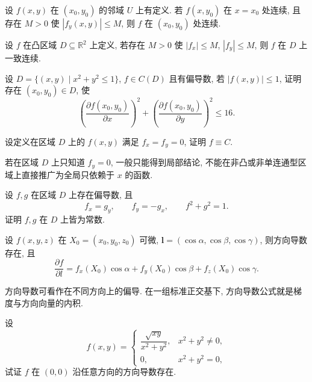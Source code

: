 \documentclass[../数学分析培优讲义.tex]{subfiles}
\begin{document}
\begin{example}
设 $f(x,y)$ 在 $(x_0,y_0)$ 的邻域 $U$ 上有定义. 若 $f(x,y_0)$ 在 $x=x_0$ 处连续, 且存在 $M>0$ 使 $|f_y(x,y)|\leq M$, 则 $f$ 在 $(x_0,y_0)$ 处连续.
\end{example}
\exampleblank

\begin{example}
设 $f$ 在凸区域 $D\subseteq\mathbb{R}^2$ 上定义, 若存在 $M>0$ 使 $|f_x|\leq M$, $|f_y|\leq M$, 则 $f$ 在 $D$ 上一致连续.
\end{example}
\exampleblank

\begin{example}
设 $D=\{(x,y)\mid x^2+y^2\leq1\}$, $f\in C(D)$ 且有偏导数, 若 $|f(x,y)|\leq1$, 证明存在 $(x_0,y_0)\in D$, 使
\[
    \left(\dfrac{\partial f(x_0,y_0)}{\partial x}\right)^2
    +\left(\dfrac{\partial f(x_0,y_0)}{\partial y}\right)^2\leq16.
\]
\end{example}
\exampleblank

\begin{example}
设定义在区域 $D$ 上的 $f(x,y)$ 满足 $f_x=f_y=0$, 证明 $f\equiv C$.
\end{example}
\exampleblank

\begin{remark}
若在区域 $D$ 上只知道 $f_y=0$, 一般只能得到局部结论, 不能在非凸或非单连通型区域上直接推广为全局只依赖于 $x$ 的函数.
\end{remark}

\begin{example}
设 $f,g$ 在区域 $D$ 上存在偏导数, 且
\[
    f_x=g_y,\qquad f_y=-g_x,\qquad f^2+g^2=1.
\]
证明 $f,g$ 在 $D$ 上皆为常数.
\end{example}
\exampleblank

\begin{theorem}[\markstar]
设 $f(x,y,z)$ 在 $X_0=(x_0,y_0,z_0)$ 可微, $\bm l=(\cos\alpha,\cos\beta,\cos\gamma)$, 则方向导数存在, 且
\[
    \dfrac{\partial f}{\partial l}
    =f_x(X_0)\cos\alpha+f_y(X_0)\cos\beta+f_z(X_0)\cos\gamma.
\]
\end{theorem}

\begin{remark}
方向导数可看作在不同方向上的偏导. 在一组标准正交基下, 方向导数公式就是梯度与方向向量的内积.
\end{remark}

\begin{example}
设
\[
    f(x,y)=
    \begin{cases}
        \dfrac{\sqrt{xy}}{x^2+y^2}, & x^2+y^2\ne0,\\
        0, & x^2+y^2=0,
    \end{cases}
\]
试证 $f$ 在 $(0,0)$ 沿任意方向的方向导数存在.
\end{example}
\exampleblank
\end{document}
